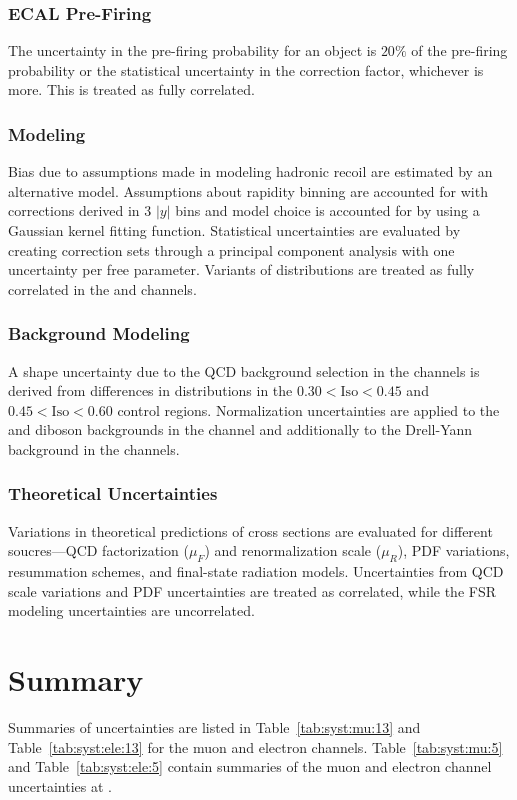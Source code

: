 \subsubsection{ECAL Pre-Firing}
The uncertainty in the pre-firing probability for an object is $20\%$ of the pre-firing probability or the statistical uncertainty in the correction factor, whichever is more. This is treated as fully correlated.

\subsubsection{\met Modeling}
Bias due to assumptions made in modeling hadronic recoil are estimated by an alternative model. Assumptions about rapidity binning are accounted for with corrections derived in 3 $|y|$ bins and model choice is accounted for by using a Gaussian kernel fitting function. Statistical uncertainties are evaluated by creating correction sets through a principal component analysis with one uncertainty per free parameter. Variants of \mt distributions are treated as fully correlated in the \Wp and \Wm channels.

\subsubsection{Background Modeling}
A shape uncertainty due to the QCD background selection in the \W channels is derived from differences in \mt distributions in the $0.30 < \mathrm{Iso} <  0.45$ and $0.45 < \mathrm{Iso} <  0.60$ control regions. Normalization uncertainties are applied to the \ttbar and diboson backgrounds in the \Z channel and additionally to the Drell-Yann background in the \W channels.

\subsubsection{Theoretical Uncertainties}
Variations in theoretical predictions of cross sections are evaluated for different soucres---QCD factorization ($\mu_F$) and renormalization scale ($\mu_R$), PDF variations, resummation schemes, and final-state radiation models. Uncertainties from QCD scale variations and PDF uncertainties are treated as correlated, while the FSR modeling uncertainties are uncorrelated.

\section{Summary}
Summaries of uncertainties are listed in Table~\ref{tab:syst:mu:13}  and Table~\ref{tab:syst:ele:13} for the \sh muon and electron channels. Table~\ref{tab:syst:mu:5} and Table~\ref{tab:syst:ele:5} contain summaries of the muon and electron channel uncertainties at \sg.






